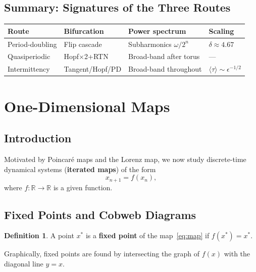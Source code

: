 \documentclass[11pt,letterpaper]{article}
\theoremstyle{definition}
\newtheorem{definition}{Definition}[section]
\theoremstyle{plain}
\theoremstyle{remark}
\newcommand{\R}{\mathbb{R}}
\newcommand{\xstar}{x^*}
\begin{document}
\subsection{Summary: Signatures of the Three Routes}

\begin{center}
\renewcommand{\arraystretch}{1.4}
\begin{tabular}{@{}llll@{}}
\toprule
\textbf{Route} & \textbf{Bifurcation} & \textbf{Power spectrum}
  & \textbf{Scaling} \\
\midrule
Period-doubling & Flip cascade & Subharmonics $\omega/2^n$
  & $\delta \approx 4.67$ \\
Quasiperiodic & Hopf$\times$2+RTN & Broad-band after torus
  & --- \\
Intermittency & Tangent/Hopf/PD & Broad-band throughout
  & $\langle\tau\rangle \sim \epsilon^{-1/2}$ \\
\bottomrule
\end{tabular}
\end{center}

\section{One-Dimensional Maps}\label{sec:1d-maps}

\subsection{Introduction}

Motivated by Poincar\'e maps and the Lorenz map, we now study
discrete-time dynamical systems (\textbf{iterated maps}) of the form
\begin{equation}\label{eq:map}
  x_{n+1} = f(x_n),
\end{equation}
where $f:\R\to\R$ is a given function.

\subsection{Fixed Points and Cobweb Diagrams}

\begin{definition}
A point $\xstar$ is a \textbf{fixed point} of the map~\eqref{eq:map} if
$f(\xstar) = \xstar$.
\end{definition}

Graphically, fixed points are found by intersecting the graph of $f(x)$
with the diagonal line $y=x$.
\end{document}
